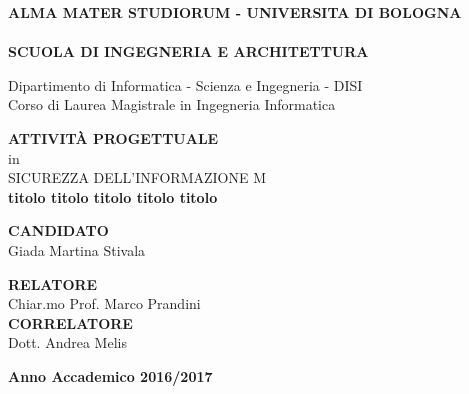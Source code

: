\thispagestyle{empty}
\begin{titlepage}

\vspace*{-1.5cm}
\begin{center}
  \large
  \textbf{ALMA MATER STUDIORUM - UNIVERSITA DI BOLOGNA}\\
  
  \hrulefill\\
  
  \textbf{SCUOLA DI INGEGNERIA  E ARCHITETTURA}\\
  \vspace*{.75cm}
  
  
  Dipartimento di Informatica - Scienza e Ingegneria - DISI\\
  Corso di Laurea Magistrale in Ingegneria Informatica\\
  
  \vspace*{1.2cm}
  
  
  \textbf{ATTIVIT\`A PROGETTUALE}\\
  \vspace*{.4cm}
  in\\
  \vspace*{.4cm}
  SICUREZZA DELL'INFORMAZIONE M\\

  \vspace*{2cm} \LARGE
  \textbf{titolo titolo titolo titolo titolo}\\
 \end{center}
 
 \vspace*{3cm}
 
 \begin{flushleft}
  \textbf{CANDIDATO}\\ Giada Martina Stivala \\
\end{flushleft}

\vspace*{-2cm}

 \begin{flushright}
  \textbf{RELATORE}\\ Chiar.mo Prof. Marco Prandini \\
  \vspace*{1.5cm}
  \textbf{CORRELATORE}\\ Dott. Andrea Melis
 \end{flushright}


\vspace*{2cm}

\begin{center}
	\textbf{
  Anno Accademico 2016/2017\\
  }
\end{center} 
\clearpage
\end{titlepage}